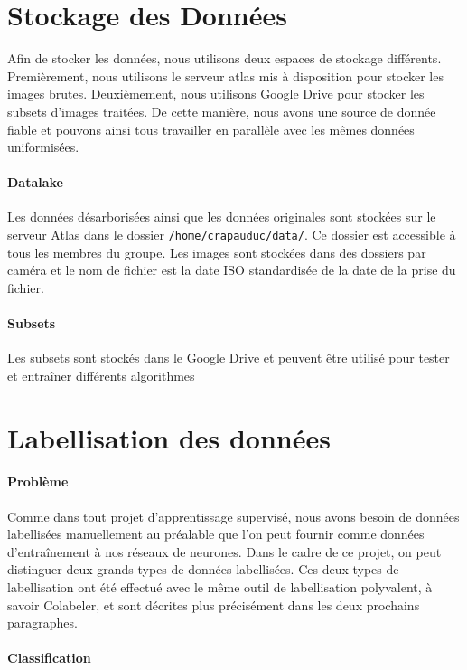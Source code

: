 \section{Stockage des Données}
Afin de stocker les données, nous utilisons deux espaces de stockage différents. Premièrement, nous utilisons le serveur atlas mis à disposition pour stocker les images brutes. Deuxièmement, nous utilisons Google Drive pour stocker les subsets d'images traitées. De cette manière, nous avons une source de donnée fiable et pouvons ainsi tous travailler en parallèle avec les mêmes données uniformisées.

\paragraph*{Datalake}

Les données désarborisées ainsi que les données originales sont stockées sur le serveur Atlas dans le dossier \texttt{/home/crapauduc/data/}. Ce dossier est accessible à tous les membres du groupe. Les images sont stockées dans des dossiers par caméra et le nom de fichier est la date ISO standardisée de la date de la prise du fichier.

\paragraph{Subsets}

Les subsets sont stockés dans le Google Drive et peuvent être utilisé pour tester et entraîner différents algorithmes

\section{Labellisation des données}

\paragraph{Problème}

Comme dans tout projet d'apprentissage supervisé, nous avons besoin de données labellisées manuellement au préalable que l'on peut fournir comme données d'entraînement à nos réseaux de neurones. Dans le cadre de ce projet, on peut distinguer deux grands types de données labellisées. Ces deux types de labellisation ont été effectué avec le même outil de labellisation polyvalent, à savoir Colabeler, et sont décrites plus précisément dans les deux prochains paragraphes.

\paragraph{Classification}

